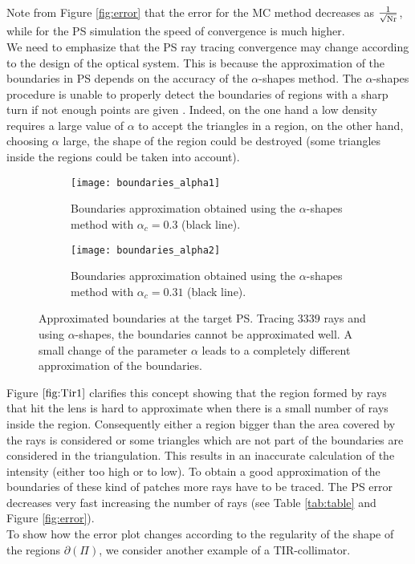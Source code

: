 Note from Figure \ref{fig:error} that the error for the MC method decreases as $\frac{1}{\sqrt{\textrm{Nr}}}$, while for the PS simulation the speed of convergence is much higher.\\ \indent
We need to emphasize that the PS ray tracing convergence may change according to the design of the optical system.
This is because the approximation of the boundaries in PS depends on the accuracy of the $\alpha$-shapes method.
The $\alpha$-shapes procedure is unable to properly detect the boundaries of regions with a sharp turn if not enough points are given
\cite{teichmann1998surface}. Indeed, on the one hand a low density requires a large value of $\alpha$ to accept the triangles in a region, on the other hand,
 choosing $\alpha$ large, the shape of the region could be destroyed (some triangles inside the regions could be taken into account).
\begin{figure}[h]
\centering
\begin{subfigure}{.48\textwidth}
  \centering
  \texttt{[image: boundaries\_alpha1]}
  \caption{Boundaries approximation obtained using the $\alpha$-shapes method with $\alpha_c = 0.3$ (black line).}
\end{subfigure}
\begin{subfigure}{.48\textwidth}
  \centering
  \texttt{[image: boundaries\_alpha2]}
  \caption{Boundaries approximation obtained using the $\alpha$-shapes method with $\alpha_c = 0.31$ (black line).}
\end{subfigure}
\caption{Approximated boundaries at the target PS. Tracing $3339$ rays and using $\alpha$-shapes, the boundaries cannot be approximated well. 
A small change of the parameter $\alpha$ leads to a completely different approximation of the boundaries.}
\label{fig:Tir1}
\end{figure}
Figure $\ref{fig:Tir1}$ clarifies this concept showing that the region formed by rays that hit the lens is hard to approximate when there is a small number of rays inside the region. Consequently either a region bigger than the area covered by the rays is considered or some triangles which are not part of the boundaries are considered in the triangulation. This results in an inaccurate calculation of the intensity (either too high or to low). To obtain a good approximation of the boundaries of these kind of patches more rays have to be traced. The PS error decreases very fast increasing the number of rays (see Table
 \ref{tab:table} and Figure \ref{fig:error}).
 \\\indent To show how the error plot changes according to the regularity of the shape of the regions $\partial$$(\Pi)$, we consider another example of a TIR-collimator.
